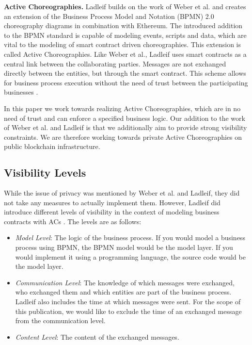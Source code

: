 \documentclass[runningheads]{llncs}
\newcommand{\ber}[1]{\textit{#1}}
\begin{document}
\textbf{Active Choreographies.} Ladleif builds on the work of Weber et al. and creates an extension of the Business Process Model and Notation (BPMN) 2.0 choreography diagrams in combination with Ethereum. The introduced addition to the BPMN standard is capable of modeling events, scripts and data, which are vital to the modeling of smart contract driven choreographies. This extension is called Active Choreographies. Like   Weber et al., Ladleif uses smart contracts as a central link between the collaborating parties. Messages are not exchanged directly between the entities, but through the smart contract. This scheme allows for business process execution without the need of trust between the participating businesses \cite{ladleif}. 


In this paper we work towards realizing Active Choreographies, which are in no need of trust and can enforce a specified business logic. Our addition to the work of Weber et al. and Ladleif is that we additionally aim to provide strong visibility constraints. We are therefore working towards private Active Choreographies on public blockchain infrastructure. 




\subsection{Visibility Levels} \label{subsec:levels}

While the issue of privacy was mentioned by Weber et al. and Ladleif, they did not take any measures to actually implement them. However, Ladleif did introduce different levels of visibility in the context of modeling business contracts with ACs \cite{ladleif}. The levels are as follows:



\begin{itemize}
    \item \ber{Model Level}: The logic of the business process. If you would model a business process using BPMN, the BPMN model would be the model layer. If you would implement it using a programming language, the source code would be the model layer.
    \item \ber{Communication Level}: The knowledge of which messages were exchanged, who exchanged them and which entities are part of the business process. Ladleif also includes the time at which messages were sent. For the scope of this publication, we would like to exclude the time of an exchanged message from the communication level.
    \item \ber{Content Level}: The content of the exchanged messages.
\end{itemize}
\end{document}
